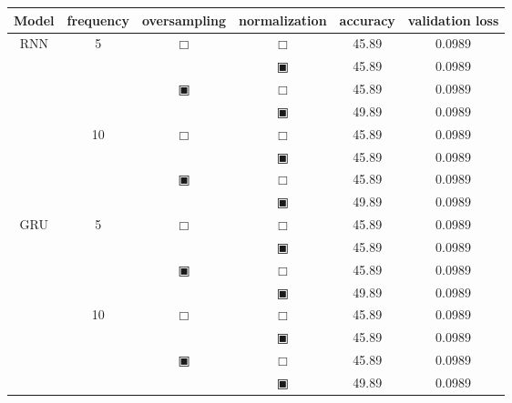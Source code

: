 \begin{table}[H]
	\renewcommand{\arraystretch}{.68}
	\begin{tabular}{|c|c|c|c|c|c|}
		\hline
		Model & frequency & oversampling & normalization & accuracy & validation loss\\
		\hline\hline
		\multirow{8}{*}{RNN}& \multirow{4}{*}{5} & \multirow{2}{*}{$\Box$} & $\Box$ & 45.89 & 0.0989\\\cline{4-6}
				    &                    &                         & $\blackinwhitesquare$ & 45.89 & 0.0989\\\cline{3-6}
				    &                    & \multirow{2}{*}{$\blackinwhitesquare$} & $\Box$ & 45.89 & 0.0989\\\cline{4-6}
				    &                    &                         & $\blackinwhitesquare$ & 49.89 & 0.0989\\\cline{2-6}
				    & \multirow{4}{*}{10} & \multirow{2}{*}{$\Box$} & $\Box$ & 45.89 & 0.0989\\\cline{4-6}
				    &                     &                         & $\blackinwhitesquare$ & 45.89 & 0.0989\\\cline{3-6}
				    &                     & \multirow{2}{*}{$\blackinwhitesquare$} & $\Box$ & 45.89 & 0.0989\\\cline{4-6}
				    &                     &                         & $\blackinwhitesquare$ & 49.89 & 0.0989\\\cline{2-6}
		\hline\hline
		\multirow{8}{*}{GRU}& \multirow{4}{*}{5} & \multirow{2}{*}{$\Box$} & $\Box$ & 45.89 & 0.0989\\\cline{4-6}
				    &                    &                         & $\blackinwhitesquare$ & 45.89 & 0.0989\\\cline{3-6}
				    &                    & \multirow{2}{*}{$\blackinwhitesquare$} & $\Box$ & 45.89 & 0.0989\\\cline{4-6}
				    &                    &                         & $\blackinwhitesquare$ & 49.89 & 0.0989\\\cline{2-6}
				    & \multirow{4}{*}{10} & \multirow{2}{*}{$\Box$} & $\Box$ & 45.89 & 0.0989\\\cline{4-6}
				    &                     &                         & $\blackinwhitesquare$ & 45.89 & 0.0989\\\cline{3-6}
				    &                     & \multirow{2}{*}{$\blackinwhitesquare$} & $\Box$ & 45.89 & 0.0989\\\cline{4-6}
				    &                     &                         & $\blackinwhitesquare$ & 49.89 & 0.0989\\\cline{2-6}

\end{tabular}
\end{table}
